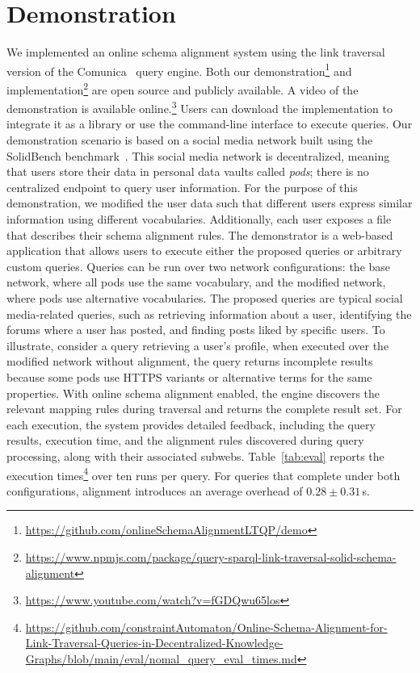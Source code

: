 \section{Demonstration}\label{sec:demo}

We implemented an online schema alignment system using the link traversal version of the Comunica~\cite{taelman2018comunica} query engine.
Both our demonstration\footnote{\url{https://github.com/onlineSchemaAlignmentLTQP/demo}} and implementation\footnote{\url{https://www.npmjs.com/package/query-sparql-link-traversal-solid-schema-alignment}} are open source and publicly available.
A video of the demonstration is available online.\footnote{\url{https://www.youtube.com/watch?v=fGDQwu65los}}
Users can download the implementation to integrate it as a library or use the command-line interface to execute queries.
Our demonstration scenario is based on a social media network built using the SolidBench benchmark~\cite{Taelman2023}.
This social media network is decentralized, meaning that users store their data in personal data vaults called \emph{pods}; there is no centralized endpoint to query user information.
For the purpose of this demonstration, we modified the user data such that different users express similar information using different vocabularies.
Additionally, each user exposes a file that describes their schema alignment rules.
The demonstrator is a web-based application that allows users to execute either the proposed queries or arbitrary custom queries.
Queries can be run over two network configurations: the base network, where all pods use the same vocabulary, and the modified network, where pods use alternative vocabularies.
The proposed queries are typical social media-related queries, such as retrieving information about a user, identifying the forums where a user has posted, and finding posts liked by specific users.
To illustrate, consider a query retrieving a user's profile, when executed over the modified network without alignment, the query returns incomplete results because some pods use HTTPS variants or alternative terms for the same properties.
With online schema alignment enabled, the engine discovers the relevant mapping rules during traversal and returns the complete result set.
For each execution, the system provides detailed feedback, including the query results, execution time, and the alignment rules discovered during query processing, along with their associated subwebs.
Table~\ref{tab:eval} reports the execution times\footnote{\url{https://github.com/constraintAutomaton/Online-Schema-Alignment-for-Link-Traversal-Queries-in-Decentralized-Knowledge-Graphs/blob/main/eval/nomal_query_eval_times.md}} over ten runs per query.
For queries that complete under both configurations, alignment introduces an average overhead of $0.28 \pm 0.31$\,s.

